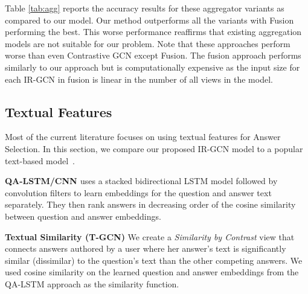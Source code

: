 Table \ref{tab:agg} reports the accuracy results for these aggregator variants as compared to our model. Our method outperforms all the variants with Fusion performing the best. This worse performance reaffirms that existing aggregation models are not suitable for our problem. Note that these approaches perform worse than even Contrastive GCN except Fusion. The fusion approach performs similarly to our approach but is computationally expensive as the input size for each IR-GCN in fusion is linear in the number of all views in the model.

\subsection{Textual Features}
Most of the current literature focuses on using textual features for Answer Selection. In this section, we compare our proposed IR-GCN model to a popular text-based model~\cite{Tan2015}. %

\noindent
\textbf{QA-LSTM/CNN \cite{Tan2015}} uses a stacked bidirectional LSTM model followed by convolution filters to learn embeddings for the question and answer text separately. They then rank answers in decreasing order of the cosine similarity between question and answer embeddings.

\noindent
\textbf{Textual Similarity (T-GCN)} We create a \textit{Similarity by Contrast} view that connects answers authored by a user where her answer's text is significantly similar (dissimilar) to the question's text than the other competing answers. We used cosine similarity on the learned question and answer embeddings from the QA-LSTM approach as the similarity function.

